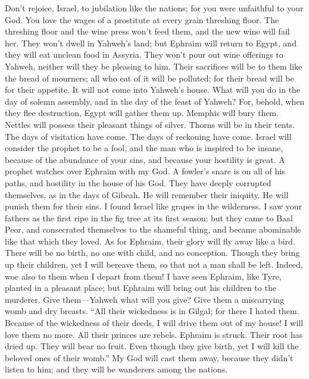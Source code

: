  Don't rejoice, Israel, to jubilation like the nations;
for you were unfaithful to your God. You love the wages of a prostitute
at every grain threshing floor.  The threshing floor and
the wine press won't feed them, and the new wine will fail her.
 They won't dwell in Yahweh's land; but Ephraim will
return to Egypt, and they will eat unclean food in Assyria.
 They won't pour out wine offerings to Yahweh, neither
will they be pleasing to him. Their sacrifices will be to them like the
bread of mourners; all who eat of it will be polluted; for their bread
will be for their appetite. It will not come into Yahweh's house.
 What will you do in the day of solemn assembly, and in
the day of the feast of Yahweh?  For, behold, when they
flee destruction, Egypt will gather them up. Memphis will bury them.
Nettles will possess their pleasant things of silver. Thorns will be in
their tents.  The days of visitation have come. The days
of reckoning have come. Israel will consider the prophet to be a fool,
and the man who is inspired to be insane, because of the abundance of
your sins, and because your hostility is great.  A prophet
watches over Ephraim with my God. A fowler's snare is on all of his
paths, and hostility in the house of his God.  They have
deeply corrupted themselves, as in the days of Gibeah. He will remember
their iniquity. He will punish them for their sins.  I
found Israel like grapes in the wilderness. I saw your fathers as the
first ripe in the fig tree at its first season; but they came to Baal
Peor, and consecrated themselves to the shameful thing, and became
abominable like that which they loved.  As for Ephraim,
their glory will fly away like a bird. There will be no birth, no one
with child, and no conception.  Though they bring up
their children, yet I will bereave them, so that not a man shall be
left. Indeed, woe also to them when I depart from them! 
I have seen Ephraim, like Tyre, planted in a pleasant place; but Ephraim
will bring out his children to the murderer.  Give
them---Yahweh what will you give? Give them a miscarrying womb and dry
breasts.  ``All their wickedness is in Gilgal; for there
I hated them. Because of the wickedness of their deeds, I will drive
them out of my house! I will love them no more. All their princes are
rebels.  Ephraim is struck. Their root has dried up. They
will bear no fruit. Even though they give birth, yet I will kill the
beloved ones of their womb.''  My God will cast them
away, because they didn't listen to him; and they will be wanderers
among the nations.


